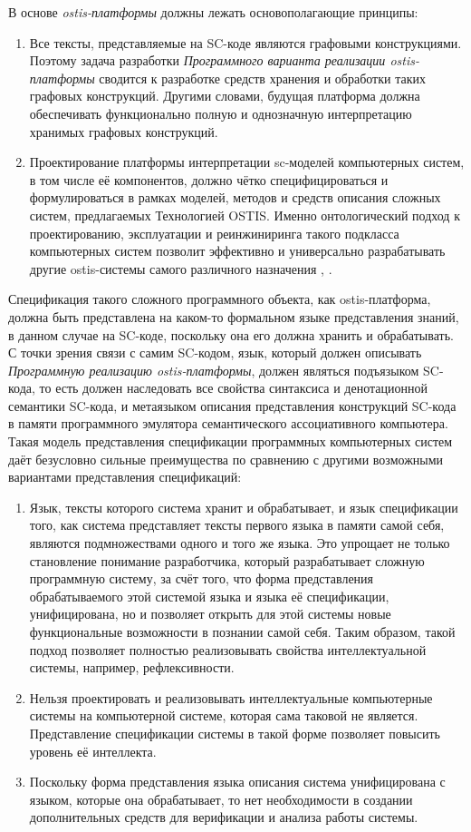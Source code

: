 В основе \textit{ostis-платформы} должны лежать основополагающие принципы:
\begin{enumerate}
    \item Все тексты, представляемые на SC-коде являются графовыми конструкциями. Поэтому задача разработки \textit{Программного варианта реализации ostis-платформы} сводится к разработке средств хранения и обработки таких графовых конструкций. Другими словами, будущая платформа должна обеспечивать функционально полную и однозначную интерпретацию хранимых графовых конструкций.
    \item Проектирование платформы интерпретации sc-моделей компьютерных систем, в том числе её компонентов, должно чётко специфицироваться и формулироваться в рамках моделей, методов и средств описания сложных систем, предлагаемых Технологией OSTIS. Именно онтологический подход к проектированию, эксплуатации и реинжиниринга такого подкласса компьютерных систем позволит эффективно и универсально разрабатывать другие ostis-системы самого различного назначения \cite{Molorodov2019}, .
\end{enumerate}

Спецификация такого сложного программного объекта, как ostis-платформа, должна быть представлена на каком-то формальном языке представления знаний, в данном случае на SC-коде, поскольку она его должна хранить и обрабатывать. С точки зрения связи с самим SC-кодом, язык, который должен описывать \textit{Программную реализацию ostis-платформы}, должен являться подъязыком SC-кода, то есть должен наследовать все свойства синтаксиса и денотационной семантики SC-кода, и метаязыком описания представления конструкций SC-кода в памяти программного эмулятора семантического ассоциативного компьютера. Такая модель представления спецификации программных компьютерных систем даёт безусловно сильные преимущества по сравнению с другими возможными вариантами представления спецификаций:
\begin{enumerate}
    \item Язык, тексты которого система хранит и обрабатывает, и язык спецификации того, как система представляет тексты первого языка в памяти самой себя, являются подмножествами одного и того же языка. Это упрощает не только становление понимание разработчика, который разрабатывает сложную программную систему, за счёт того, что форма представления обрабатываемого этой системой языка и языка её спецификации, унифицирована, но и позволяет открыть для этой системы новые функциональные возможности в познании самой себя. Таким образом, такой подход позволяет полностью реализовывать свойства интеллектуальной системы, например, рефлексивности.
    \item Нельзя проектировать и реализовывать интеллектуальные компьютерные системы на компьютерной системе, которая сама таковой не является. Представление спецификации системы в такой форме позволяет повысить уровень её интеллекта.
    \item Поскольку форма представления языка описания система унифицирована с языком, которые она обрабатывает, то нет необходимости в создании дополнительных средств для верификации и анализа работы системы.
\end{enumerate}

